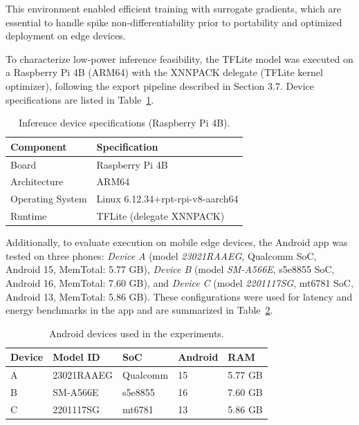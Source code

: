 This environment enabled efficient training with surrogate gradients, which are essential to handle
spike non-differentiability prior to portability and optimized deployment on edge devices.

To characterize low-power inference feasibility, the TFLite model was executed on a Raspberry Pi 4B
(ARM64) with the XNNPACK delegate (TFLite kernel optimizer), following the export pipeline described
in Section 3.7. Device specifications are listed in Table~\ref{tab:hardware_rpi}.

\begin{table}[H]
\centering
\caption{Inference device specifications (Raspberry Pi 4B).}
\begin{tabular}{ll}
\toprule
Component & Specification \\
\midrule
Board & Raspberry Pi 4B \\
Architecture & ARM64 \\
Operating System & Linux 6.12.34+rpt-rpi-v8-aarch64 \\
Runtime & TFLite (delegate XNNPACK) \\
\bottomrule
\end{tabular}
\label{tab:hardware_rpi}
\end{table}

Additionally, to evaluate execution on mobile edge devices, the Android app was tested on three phones:
\textit{Device A} (model \textit{23021RAAEG}, Qualcomm SoC, Android 15, MemTotal: 5.77 GB),
\textit{Device B} (model \textit{SM-A566E}, s5e8855 SoC, Android 16, MemTotal: 7.60 GB), and
\textit{Device C} (model \textit{2201117SG}, mt6781 SoC, Android 13, MemTotal: 5.86 GB). These
configurations were used for latency and energy benchmarks in the app and are summarized in
Table~\ref{tab:android_devices}.

\begin{table}[H]
\centering
\caption{Android devices used in the experiments.}
\begin{tabular}{lllll}
\toprule
Device & Model ID & SoC & Android & RAM \\
\midrule
A & 23021RAAEG & Qualcomm & 15 & 5.77 GB \\
B & SM-A566E & s5e8855 & 16 & 7.60 GB \\
C & 2201117SG & mt6781 & 13 & 5.86 GB \\
\bottomrule
\end{tabular}
\label{tab:android_devices}
\end{table}

